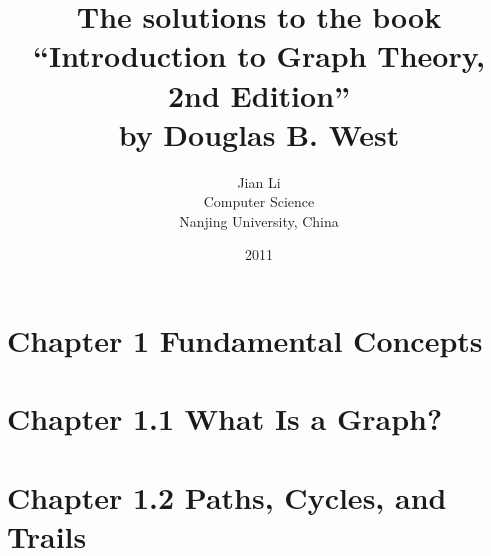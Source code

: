 \documentclass[12pt,a4paper]{article}
\begin{document}
\title{The solutions to the book \\ ``Introduction to Graph Theory, 2nd Edition'' \\ by Douglas B. West}
\author{Jian Li \\ Computer Science \\ Nanjing University, China}
\date{2011}
\maketitle
\pagebreak

\section*{Chapter 1 Fundamental Concepts}
\pagebreak


\section*{Chapter 1.1 What Is a Graph?}












\pagebreak


\section*{Chapter 1.2 Paths, Cycles, and Trails}














\pagebreak
\end{document}
